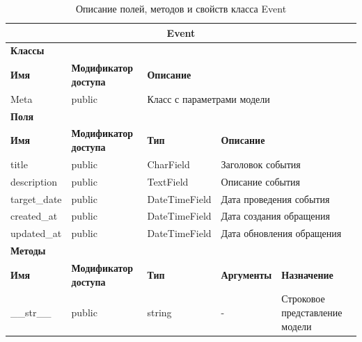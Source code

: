 \documentclass{../includes/TechDoc}
\begin{document}
    \begin{table}[ht]
        \caption{\label{tab:class-Event-table}Описание полей, методов и свойств класса Event}
        \centering
        \begin{tabular}{|p{3.2cm}|p{3cm}|p{2.9cm}|p{2.9cm}|p{4cm}|}
            \hline
            \multicolumn{5}{|c|}{Event} \\ \hline
            \multicolumn{5}{|l|}{\textbf{Классы}} \\ \hline
            \textbf{Имя} & \textbf{Модификатор доступа} & \multicolumn{3}{p{9.8cm}|}{\textbf{Описание}} \\ \hline
            Meta & public & \multicolumn{3}{p{9.8cm}|}{Класс с параметрами модели} \\ \hline
            \multicolumn{5}{|l|}{\textbf{Поля}} \\ \hline
            \textbf{Имя} & \textbf{Модификатор доступа} & \textbf{Тип} & \multicolumn{2}{p{6.9cm}|}{\textbf{Описание}} \\ \hline
            title & public & CharField & \multicolumn{2}{p{6.9cm}|}{Заголовок события} \\ \hline
            description & public & TextField & \multicolumn{2}{p{6.9cm}|}{Описание события} \\ \hline
            target\_date & public & DateTimeField & \multicolumn{2}{p{6.9cm}|}{Дата проведения события} \\ \hline
            created\_at & public & DateTimeField & \multicolumn{2}{p{6.9cm}|}{Дата создания обращения} \\ \hline
            updated\_at & public & DateTimeField & \multicolumn{2}{p{6.9cm}|}{Дата обновления обращения} \\ \hline
            \multicolumn{5}{|l|}{\textbf{Методы}} \\ \hline
            \textbf{Имя} & \textbf{Модификатор доступа} & \textbf{Тип} & \textbf{Аргументы} & \textbf{Назначение} \\ \hline
            \_\_str\_\_ & public & string & - & Строковое представление модели \\ \hline
        \end{tabular}
    \end{table}
\end{document}
